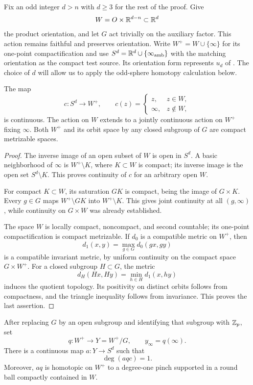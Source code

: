 Fix an odd integer $d>n$ with $d\geq3$ for the rest of the proof.  Give
\[
 W=O\times\mathbb R^{d-n}\subset\mathbb R^d
\]
the product orientation, and let $G$ act trivially on the auxiliary
factor.  This action remains faithful and preserves orientation.
Write $W^+=W\cup\{\infty\}$ for its one-point
compactification and use
$S^d=\mathbb R^d\cup\{\infty_{\mathrm{amb}}\}$ with the matching
orientation as the compact test source.  Its orientation form represents
$u_d$ of .  The choice of $d$ will allow
us to apply the odd-sphere homotopy calculation below.

\begin{lemma}
\label{lem:collapse}
The map
\[
 c:S^d\longrightarrow W^+,
 \qquad
 c(z)=
 \begin{cases}
 z,&z\in W,\\
 \infty,&z\notin W,
 \end{cases}
\]
is continuous.  The action on $W$ extends to a jointly continuous
action on $W^+$ fixing $\infty$.  Both $W^+$ and its orbit space by
any closed subgroup of $G$ are compact metrizable spaces.
\end{lemma}

\begin{proof}
The inverse image of an open subset of $W$ is open in $S^d$.  A
basic neighborhood of $\infty$ is $W^+\setminus K$, where
$K\subset W$ is compact; its inverse image is the open set
$S^d\setminus K$.  This proves continuity of $c$ for an arbitrary
open $W$.

For compact $K\subset W$, its saturation $GK$ is compact, being the
image of $G\times K$.  Every $g\in G$ maps
$W^+\setminus GK$ into $W^+\setminus K$.  This gives joint
continuity at all $(g,\infty)$, while continuity on $G\times W$ was
already established.

The space $W$ is locally compact, noncompact, and second countable;
its one-point compactification is compact metrizable.  If $d_0$ is
a compatible metric on $W^+$, then
\[
 d_1(x,y)=\max_{g\in G}d_0(gx,gy)
\]
is a compatible invariant metric, by uniform continuity on the
compact space $G\times W^+$.  For a closed subgroup $H\subset G$,
the metric
\[
 d_H(Hx,Hy)=\min_{h\in H}d_1(x,hy)
\]
induces the quotient topology.  Its positivity on distinct orbits
follows from compactness, and the triangle inequality follows from
invariance.  This proves the last assertion.
\end{proof}

\begin{lemma}
\label{lem:averaged-test}
After replacing $G$ by an open subgroup and identifying that
subgroup with $\mathbb Z_p$, set
\[
 q:W^+\longrightarrow Y=W^+/G,
 \qquad y_\infty=q(\infty).
\]
There is a continuous map $a:Y\to S^d$ such that
\begin{equation}
 \deg(aqc)=1.
 \label{top:degree-one}
\end{equation}
Moreover, $aq$ is homotopic on $W^+$ to a degree-one pinch supported
in a round ball compactly contained in $W$.
\end{lemma}

